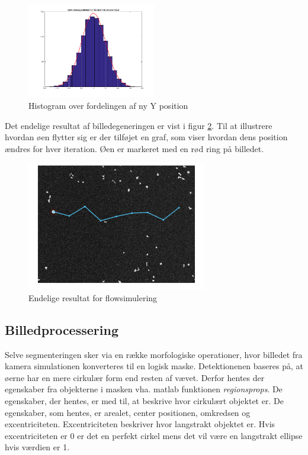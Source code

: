 \begin{figure}[H]
	\centering
	\includegraphics[width=0.5\textwidth]{billeder/software/histfit.png}
	\caption{Histogram over fordelingen af ny Y position}
	\label{fig:histfit}
\end{figure}

Det endelige resultat af billedegeneringen er vist i figur \ref{fig:finalresult}. Til at illustrere hvordan øen flytter sig er der tilføjet en graf, som viser hvordan dens position ændres for hver iteration. Øen er markeret med en rød ring på billedet.

\begin{figure}[H]
	\centering
	\includegraphics[width=0.7\textwidth]{billeder/software/final.png}
	\caption{Endelige resultat for flowsimulering}
	\label{fig:finalresult}
\end{figure}

\subsection{Billedprocessering}
Selve segmenteringen sker via en række morfologiske operationer, hvor billedet fra kamera simulationen konverteres til en logisk maske. Detektionenen baseres på, at øerne har en mere cirkulær form end resten af vævet. Derfor hentes der egenskaber fra objekterne i masken vha. matlab funktionen \textit{regionsprops}. De egenskaber, der hentes, er med til, at beskrive hvor cirkulært objektet er. De egenskaber, som hentes, er arealet, center positionen, omkredsen og excentriciteten. Excentriciteten beskriver hvor langstrakt objektet er. Hvis excentriciteten er 0 er det en perfekt cirkel mens det vil være en langstrakt ellipse hvis værdien er 1.

